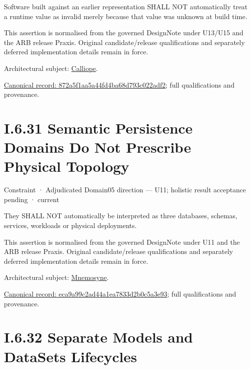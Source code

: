 Software built against an earlier representation SHALL NOT automatically
treat a runtime value as invalid merely because that value was unknown
at build time.



This assertion is normalised from the governed DesignNote under U13/U15 and the ARB release Praxis. Original candidate/release qualifications and separately deferred implementation details remain in force.



Architectural subject: \hyperref[element:466ad8f75a954c0581b5bba090443849]{Calliope}.


{\footnotesize \href{../../../../../../../../continuum/motivation/constraint/872a5f1aa5a44fd4ba68d793c022adf2.md}{Canonical record: 872a5f1aa5a44fd4ba68d793c022adf2}; full qualifications and provenance.}\par
\section*{I.6.31 Semantic Persistence Domains Do Not Prescribe Physical Topology}
\label{navigation:I.6.31}

\label{element:eca9a99c2ad44a1ea7833d2b0c5a3e93}
{\small Constraint · Adjudicated Domain05 direction — U11; holistic result acceptance pending · current}\par

They SHALL NOT automatically be interpreted as three databases, schemas, services, workloads or physical deployments.



This assertion is normalised from the governed DesignNote under U11 and the ARB release Praxis. Original candidate/release qualifications and separately deferred implementation details remain in force.



Architectural subject: \hyperref[element:7985e647bf9e4ca3ba70faf9e3e4ae02]{Mnemosyne}.


{\footnotesize \href{../../../../../../../../continuum/motivation/constraint/eca9a99c2ad44a1ea7833d2b0c5a3e93.md}{Canonical record: eca9a99c2ad44a1ea7833d2b0c5a3e93}; full qualifications and provenance.}\par
\section*{I.6.32 Separate Models and DataSets Lifecycles}
\label{navigation:I.6.32}

